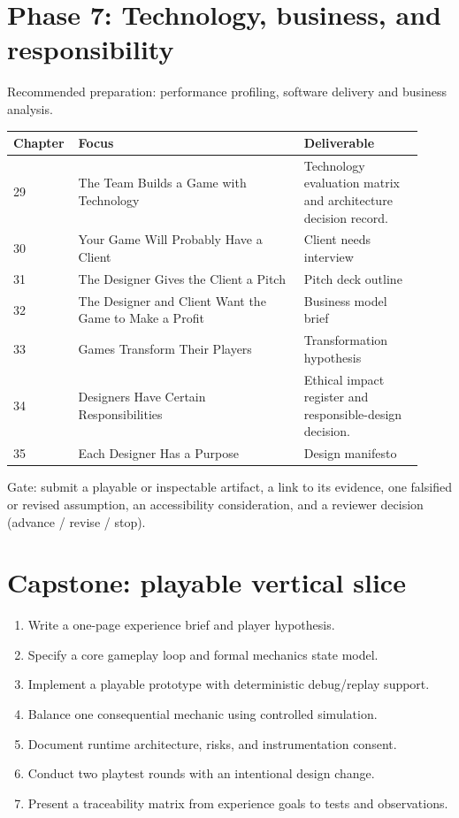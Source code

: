 \documentclass[11pt]{article}
\begin{document}
\section{Phase 7: Technology, business, and responsibility}
Recommended preparation: performance profiling, software delivery and business analysis.

\begin{longtable}{@{}p{0.11\linewidth}p{0.53\linewidth}p{0.28\linewidth}@{}}\toprule Chapter & Focus & Deliverable \\ \midrule\endhead
29 & The Team Builds a Game with Technology & Technology evaluation matrix and architecture decision record. \\
30 & Your Game Will Probably Have a Client & Client needs interview \\
31 & The Designer Gives the Client a Pitch & Pitch deck outline \\
32 & The Designer and Client Want the Game to Make a Profit & Business model brief \\
33 & Games Transform Their Players & Transformation hypothesis \\
34 & Designers Have Certain Responsibilities & Ethical impact register and responsible-design decision. \\
35 & Each Designer Has a Purpose & Design manifesto \\
\bottomrule\end{longtable}
Gate: submit a playable or inspectable artifact, a link to its evidence, one falsified or revised assumption, an accessibility consideration, and a reviewer decision (advance / revise / stop).


\section{Capstone: playable vertical slice}
\begin{enumerate}
\item Write a one-page experience brief and player hypothesis.
\item Specify a core gameplay loop and formal mechanics state model.
\item Implement a playable prototype with deterministic debug/replay support.
\item Balance one consequential mechanic using controlled simulation.
\item Document runtime architecture, risks, and instrumentation consent.
\item Conduct two playtest rounds with an intentional design change.
\item Present a traceability matrix from experience goals to tests and observations.
\end{enumerate}
\end{document}

